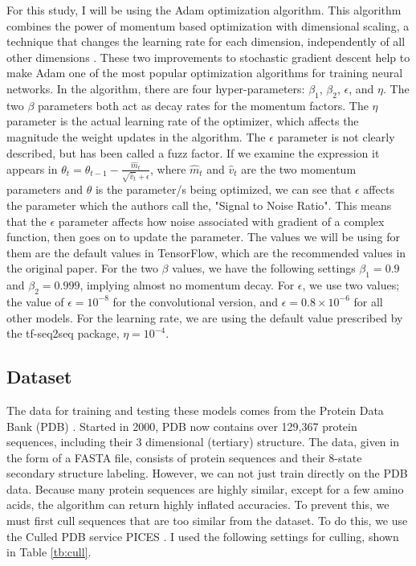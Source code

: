 \documentclass[pageno]{jpaper}
\begin{document}
\par
For this study, I will be using the Adam optimization algorithm.  This algorithm combines the power of momentum based optimization with dimensional scaling, a technique that changes the learning rate for each dimension, independently of all other dimensions \cite{kingma:2014}.  These two improvements to stochastic gradient descent help to make Adam one of the most popular optimization algorithms for training neural networks.  In the algorithm, there are four hyper-parameters: $\beta_{1}$, $\beta_{2}$, $\epsilon$, and $\eta$.  The two $\beta$ parameters both act as decay rates for the momentum factors.  The $\eta$ parameter is the actual learning rate of the optimizer, which affects the magnitude the weight updates in the algorithm.  The $\epsilon$ parameter is not clearly described, but has been called a fuzz factor.  If we examine the expression it appears in $\theta_{t} = \theta_{t - 1} - \frac{\hat{m}_{t}}{\sqrt{\hat{v}_{t}} + \epsilon}$, where $\hat{m}_{t}$ and $\hat{v}_{t}$ are the two momentum parameters and $\theta$ is the parameter/s being optimized, we can see that $\epsilon$ affects the parameter which the authors call the, "Signal to Noise Ratio".  This means that the $\epsilon$ parameter affects how noise associated with gradient of a complex function, then goes on to update the parameter.  The values we will be using for them are the default values in TensorFlow, which are the recommended values in the original paper.  For the two $\beta$ values, we have the following settings $\beta_{1} = 0.9$ and $\beta_{2} = 0.999$, implying almost no momentum decay.  For $\epsilon$, we use two values; the value of $\epsilon = 10^{-8}$ for the convolutional version, and $\epsilon = 0.8 \times 10^{-6}$ for all other models.  For the learning rate, we are using the default value prescribed by the tf-seq2seq package, $\eta = 10^{-4}$.


\subsection{Dataset}
The data for training and testing these models comes from the Protein Data Bank (PDB) \cite{berman:2000}.  Started in 2000, PDB now contains over 129,367 protein sequences, including their 3 dimensional (tertiary) structure.  The data, given in the form of a FASTA file, consists of protein sequences and their 8-state secondary structure labeling.  However, we can not just train directly on the PDB data.  Because many protein sequences are highly similar, except for a few amino acids, the algorithm can return highly inflated accuracies.  To prevent this, we must first cull sequences that are too similar from the dataset.  To do this, we use the Culled PDB service PICES \cite{dunbrack:2005}.  I used the following settings for culling, shown in Table \ref{tb:cull}.
\end{document}
